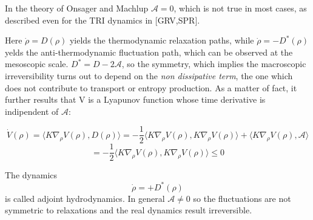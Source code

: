 \documentclass{article}
\begin{document}
In the theory of Onsager and Machlup $\mathcal{A}=0$, which is not true in most cases, as described even for the TRI dynamics in [GRV,SPR].

Here $\dot{\rho} = D(\rho)$ yields the thermodynamic relaxation paths, while $\dot{\rho} = - D^*(\rho)$ yelds the anti-thermodynamic fluctuation path, which can be observed at the mesoscopic scale. $D^* = D - 2\mathcal{A}$, so the symmetry, which implies the macroscopic irreversibility turns out to depend on the \emph{non dissipative term}, the one which does not contribute to transport or entropy production.
As a matter of fact, it further results that V is a Lyapunov function whose time derivative is indipendent of $\mathcal{A}$:

$$ \dot{V}(\rho) = \langle K \nabla_{\rho} V(\rho),D(\rho)\rangle = - \frac{1}{2} \langle K \nabla_{\rho} V(\rho) , K \nabla_{\rho} V(\rho) \rangle + \langle K \nabla_{\rho} V(\rho), \mathcal{A} \rangle $$
$$= - \frac{1}{2} \langle K \nabla_{\rho} V(\rho) , K \nabla_{\rho} V(\rho) \rangle \leq 0 $$ 

The dynamics $$ \dot{\rho} = + D^*(\rho)$$ is called adjoint hydrodynamics. In general $\mathcal{A} \neq 0$ so the fluctuations are not symmetric to relaxations and the real dynamics result irreversible.
















\end{document}

